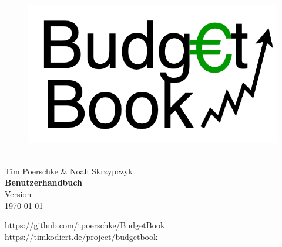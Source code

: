 
\begin{center}
	\begin{figure}[H]
		\center
		\includegraphics[scale=0.4]{img/logo}
	\end{figure}
	\APPNAME \\
	Tim Poerschke \& Noah Skrzypczyk \\
	\vspace{2cm}
	\textbf{\LARGE
		Benutzerhandbuch
	}\\	
	\vspace{2cm}
	Version \APPVERSION \\
	\today
\end{center}

\vfill

\url{https://github.com/tpoerschke/BudgetBook} \\
\url{https://timkodiert.de/project/budgetbook}
